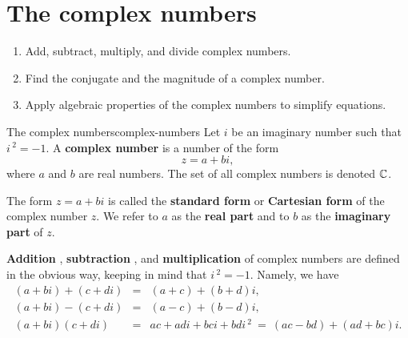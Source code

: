 \section{The complex numbers}

\begin{outcome}
  \begin{enumerate}
  \item Add, subtract, multiply, and divide complex numbers.
  \item Find the conjugate and the magnitude of a complex number.
  \item Apply algebraic properties of the complex numbers to simplify
    equations. 
  \end{enumerate}
\end{outcome}

\begin{definition}{The complex numbers}{complex-numbers}
  Let $i$ be an imaginary number such that $i\,^2=-1$. A \textbf{complex
    number}%
   is a number of the form
  \begin{equation*}
    z = a + bi,
  \end{equation*}
  where $a$ and $b$ are real numbers. The set of all complex numbers
  is denoted $\mathbb{C}$.
\end{definition}

The form $z = a+bi$ is called the \textbf{standard form}%
%
 or \textbf{Cartesian form}%
%
 of the complex number $z$.
We refer to $a$ as the \textbf{real part}%
%
 and to $b$ as the
\textbf{imaginary part}%
%
 of $z$.

\textbf{Addition}%
%
, \textbf{subtraction}%
%
, and \textbf{multiplication}%
%
 of complex numbers are
defined in the obvious way, keeping in mind that $i\,^2=-1$. Namely, we
have
\begin{eqnarray*}
  (a+bi) + (c+di) &=& (a+c) + (b+d)i, \\
  (a+bi) - (c+di) &=& (a-c) + (b-d)i, \\
  (a+bi) (c+di)   &=& ac+adi+bci+bdi\,^2 ~=~ (ac-bd) + (ad + bc)i.
\end{eqnarray*}

